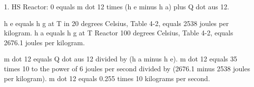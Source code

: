 1. HS Reactor:  
0 equals m dot 12 times (h e minus h a) plus Q dot aus 12.  

h e equals h g at T in 20 degrees Celsius, Table 4-2, equals 2538 joules per kilogram.  
h a equals h g at T Reactor 100 degrees Celsius, Table 4-2, equals 2676.1 joules per kilogram.  

m dot 12 equals Q dot aus 12 divided by (h a minus h e).  
m dot 12 equals 35 times 10 to the power of 6 joules per second divided by (2676.1 minus 2538 joules per kilogram).  
m dot 12 equals 0.255 times 10 kilograms per second.